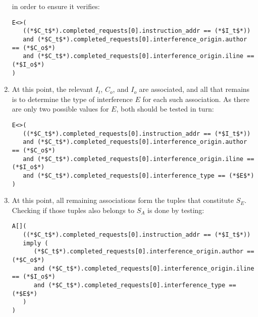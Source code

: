 \begin{enumerate}
   in order to ensure it verifies:
\begin{lstlisting}
E<>(
   ((*$C_t$*).completed_requests[0].instruction_addr == (*$I_t$*))
   and (*$C_t$*).completed_requests[0].interference_origin.author == (*$C_o$*)
   and (*$C_t$*).completed_requests[0].interference_origin.iline == (*$I_o$*)
)
\end{lstlisting}
\item
   At this point, the relevant $I_t$, $C_o$, and $I_o$ are associated, and all
   that remains is to determine the type of interference $E$ for each
   such association. As there are only two possible values for $E$, both should
   be tested in turn:
\begin{lstlisting}
E<>(
   ((*$C_t$*).completed_requests[0].instruction_addr == (*$I_t$*))
   and (*$C_t$*).completed_requests[0].interference_origin.author == (*$C_o$*)
   and (*$C_t$*).completed_requests[0].interference_origin.iline == (*$I_o$*)
   and (*$C_t$*).completed_requests[0].interference_type == (*$E$*)
)
\end{lstlisting}
\item
   At this point, all remaining associations form the tuples that constitute
   $S_E$. Checking if those tuples also belongs to $S_A$ is done by testing:
\begin{lstlisting}
A[](
   ((*$C_t$*).completed_requests[0].instruction_addr == (*$I_t$*))
   imply (
      (*$C_t$*).completed_requests[0].interference_origin.author == (*$C_o$*)
      and (*$C_t$*).completed_requests[0].interference_origin.iline == (*$I_o$*)
      and (*$C_t$*).completed_requests[0].interference_type == (*$E$*)
   )
)
\end{lstlisting}
\end{enumerate}

